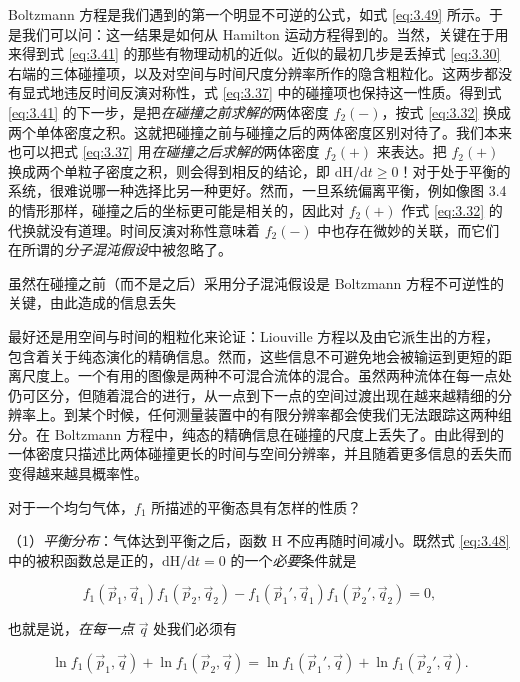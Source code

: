 Boltzmann 方程是我们遇到的第一个明显不可逆的公式，如式 \eqref{eq:3.49} 所示。于是我们可以问：这一结果是如何从 Hamilton 运动方程得到的。当然，关键在于用来得到式 \eqref{eq:3.41} 的那些有物理动机的近似。近似的最初几步是丢掉式 \eqref{eq:3.30} 右端的三体碰撞项，以及对空间与时间尺度分辨率所作的隐含粗粒化。这两步都没有显式地违反时间反演对称性，式 \eqref{eq:3.37} 中的碰撞项也保持这一性质。得到式 \eqref{eq:3.41} 的下一步，是把\emph{在碰撞之前求解的}两体密度 $f_2(-)$，按式 \eqref{eq:3.32} 换成两个单体密度之积。这就把碰撞之前与碰撞之后的两体密度区别对待了。我们本来也可以把式 \eqref{eq:3.37} 用\emph{在碰撞之后求解的}两体密度 $f_2(+)$ 来表达。把 $f_2(+)$ 换成两个单粒子密度之积，则会得到相反的结论，即 $\mathrm{d}\mathrm{H}/\mathrm{d}t\ge 0$！对于处于平衡的系统，很难说哪一种选择比另一种更好。然而，一旦系统偏离平衡，例如像图 3.4 的情形那样，碰撞之后的坐标更可能是相关的，因此对 $f_2(+)$ 作式 \eqref{eq:3.32} 的代换就没有道理。时间反演对称性意味着 $f_2(-)$ 中也存在微妙的关联，而它们在所谓的\emph{分子混沌假设}中被忽略了。

虽然在碰撞之前（而不是之后）采用分子混沌假设是 Boltzmann 方程不可逆性的关键，由此造成的信息丢失

最好还是用空间与时间的粗粒化来论证：Liouville 方程以及由它派生出的方程，包含着关于纯态演化的精确信息。然而，这些信息不可避免地会被输运到更短的距离尺度上。一个有用的图像是两种不可混合流体的混合。虽然两种流体在每一点处仍可区分，但随着混合的进行，从一点到下一点的空间过渡出现在越来越精细的分辨率上。到某个时候，任何测量装置中的有限分辨率都会使我们无法跟踪这两种组分。在 Boltzmann 方程中，纯态的精确信息在碰撞的尺度上丢失了。由此得到的一体密度只描述比两体碰撞更长的时间与空间分辨率，并且随着更多信息的丢失而变得越来越具概率性。


对于一个均匀气体，$f_1$ 所描述的平衡态具有怎样的性质？

（1）\emph{平衡分布}：气体达到平衡之后，函数 H 不应再随时间减小。既然式 \eqref{eq:3.48} 中的被积函数总是正的，$\mathrm{d}\mathrm{H}/\mathrm{d}t=0$ 的一个\emph{必要}条件就是

\begin{equation}\label{eq:3.50}
  f_1(\vec p_1,\vec q_1)f_1(\vec p_2,\vec q_2)-f_1(\vec p_1{}',\vec q_1)f_1(\vec p_2{}',\vec q_2)=0,
\end{equation}

也就是说，\emph{在每一点} $\vec q$ 处我们必须有

\begin{equation}\label{eq:3.51}
  \ln f_1(\vec p_1,\vec q)+\ln f_1(\vec p_2,\vec q)=\ln f_1(\vec p_1{}',\vec q)+\ln f_1(\vec p_2{}',\vec q).
\end{equation}

